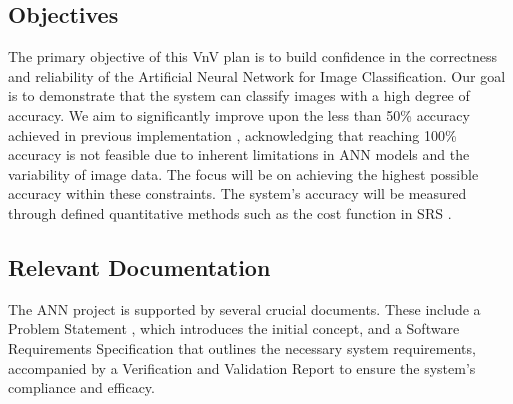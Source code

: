 \documentclass[12pt, titlepage]{article}
\begin{document}
\subsection{Objectives}

The primary objective of this VnV plan is to build confidence in the correctness and 
reliability of the Artificial Neural Network for Image Classification. Our goal is to 
demonstrate that the system can classify images with a high degree of accuracy. We aim 
to significantly improve upon the less than 50\% accuracy achieved in 
previous implementation \cite{ANN:CIFAR10}, 
acknowledging that reaching 100\% accuracy is not feasible due to inherent limitations in 
ANN models and the variability of image data. The focus will be on achieving the highest 
possible accuracy within these constraints. The system's accuracy will be measured through 
defined quantitative methods such as the cost function in SRS \cite{SRS}.




\subsection{Relevant Documentation}

The ANN project is supported by several crucial documents. 
These include a
Problem Statement \cite{ProblemStatement}, which introduces the initial concept, and a 
Software Requirements Specification \cite{SRS} that outlines the necessary system requirements, accompanied 
by a Verification and Validation Report \cite{VnVReport} to ensure the system's compliance and efficacy.
\end{document}
